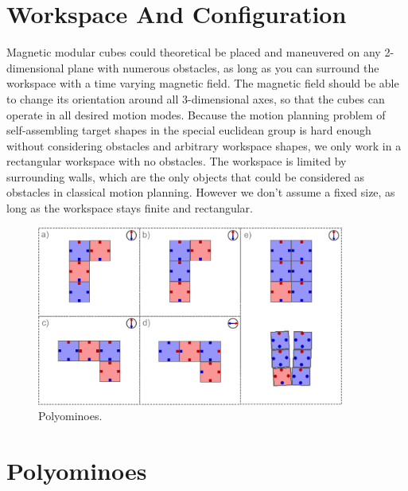 \section{Workspace And Configuration}
Magnetic modular cubes could theoretical be placed and maneuvered on any 2-dimensional plane with numerous obstacles, as long as you can surround the workspace with a time varying magnetic field.
The magnetic field should be able to change its orientation around all 3-dimensional axes, so that the cubes can operate in all desired motion modes.
Because the motion planning problem of self-assembling target shapes in the special euclidean group is hard enough without considering obstacles and arbitrary workspace shapes, we only work in a rectangular workspace with no obstacles.
The workspace is limited by surrounding walls, which are the only objects that could be considered as obstacles in classical motion planning.
However we don't assume a fixed size, as long as the workspace stays finite and rectangular.


\begin{figure}
	\centering
	\includegraphics[width=0.90\textwidth]{figures/polyominoes.pdf}
	\caption{Polyominoes.}
	\label{fig:polyominoes}
\end{figure}

\section{Polyominoes}



